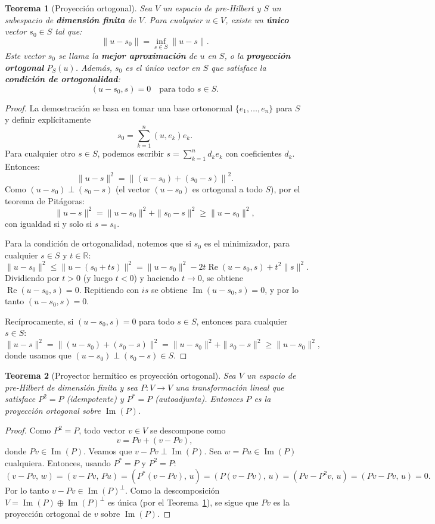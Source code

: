 \documentclass[a4paper,11pt]{report}
\newtheorem{theorem}{Teorema}[chapter]
\begin{document}
\begin{theorem}[Proyección ortogonal]
\label{thm:proyeccion_ortogonal}
Sea $V$ un espacio de pre-Hilbert y $S$ un subespacio de \textbf{dimensión finita} de $V$. Para cualquier $u \in V$, existe un \textbf{único} vector $s_0 \in S$ tal que:
\[
\|u - s_0\| = \inf_{s \in S} \|u - s\|.
\]
Este vector $s_0$ se llama la \textbf{mejor aproximación} de $u$ en $S$, o la \textbf{proyección ortogonal} $P_S(u)$. Además, $s_0$ es el único vector en $S$ que satisface la \textbf{condición de ortogonalidad}:
\[
(u - s_0, s) = 0 \quad \text{para todo } s \in S.
\]
\end{theorem}
\begin{proof}
La demostración se basa en tomar una base ortonormal $\{e_1, \ldots, e_n\}$ para $S$ y definir explícitamente 
\[
s_0 = \sum_{k=1}^n (u, e_k) e_k.
\]
Para cualquier otro $s \in S$, podemos escribir $s = \sum_{k=1}^n d_k e_k$ con coeficientes $d_k$. Entonces:
\[
\|u - s\|^2 = \left\| (u - s_0) + (s_0 - s) \right\|^2.
\]
Como $(u - s_0) \perp (s_0 - s)$ (el vector $(u-s_0)$ es ortogonal a todo $S$), por el teorema de Pitágoras:
\[
\|u - s\|^2 = \|u - s_0\|^2 + \|s_0 - s\|^2 \geq \|u - s_0\|^2,
\]
con igualdad si y solo si $s = s_0$.

Para la condición de ortogonalidad, notemos que si $s_0$ es el minimizador, para cualquier $s \in S$ y $t \in \mathbb{R}$:
\[
\|u - s_0\|^2 \leq \|u - (s_0 + ts)\|^2 = \|u - s_0\|^2 - 2t \operatorname{Re}(u - s_0, s) + t^2\|s\|^2.
\]
Dividiendo por $t > 0$ (y luego $t < 0$) y haciendo $t \to 0$, se obtiene $\operatorname{Re}(u - s_0, s) = 0$. Repitiendo con $is$ se obtiene $\operatorname{Im}(u - s_0, s) = 0$, y por lo tanto $(u - s_0, s) = 0$.

Recíprocamente, si $(u - s_0, s) = 0$ para todo $s \in S$, entonces para cualquier $s \in S$:
\[
\|u - s\|^2 = \|(u - s_0) + (s_0 - s)\|^2 = \|u - s_0\|^2 + \|s_0 - s\|^2 \geq \|u - s_0\|^2,
\]
donde usamos que $(u - s_0) \perp (s_0 - s) \in S$.
\end{proof}

\begin{theorem}[Proyector hermítico es proyección ortogonal]
\label{prop:proyector_hermitico}
Sea $V$ un espacio de pre-Hilbert de dimensión finita y sea $P\colon V\to V$ una transformación lineal que satisface $P^2=P$ (idempotente) y $P^*=P$ (autoadjunta). Entonces $P$ es la proyección ortogonal sobre $\operatorname{Im}(P)$.
\end{theorem}

\begin{proof}
Como $P^2=P$, todo vector $v\in V$ se descompone como
\[
v = Pv + (v - Pv),
\]
donde $Pv\in\operatorname{Im}(P)$.  Veamos que $v-Pv\perp\operatorname{Im}(P)$.  Sea $w=Pu\in\operatorname{Im}(P)$ cualquiera.  Entonces, usando $P^*=P$ y $P^2=P$:
\[
(v-Pv,\,w) = (v-Pv,\,Pu) = (P^*(v-Pv),\,u) = (P(v-Pv),\,u) = (Pv-P^2v,\,u) = (Pv-Pv,\,u) = 0.
\]
Por lo tanto $v-Pv\in\operatorname{Im}(P)^\perp$. Como la descomposición $V=\operatorname{Im}(P)\oplus\operatorname{Im}(P)^\perp$ es única (por el Teorema~\ref{thm:proyeccion_ortogonal}), se sigue que $Pv$ es la proyección ortogonal de $v$ sobre $\operatorname{Im}(P)$.
\end{proof}
\end{document}
